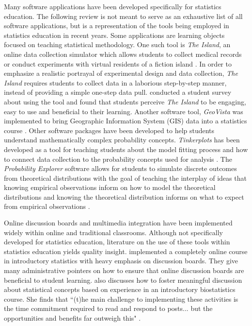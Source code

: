 \documentclass[11pt]{isuthesis}\usepackage[]{graphicx}\usepackage[]{color}
\begin{document}
Many software applications have been developed specifically for statistics education. The following review is not meant to serve as an exhaustive list of all software applications, but is a representation of the tools being employed in statistics education in recent years. Some applications are learning objects focused on teaching statistical methodology. One such tool is \textit{The Island}, an online data collection simulator which allows students to collect medical records or conduct experiments with virtual residents of a fiction island \citep{Bulmer2011}. In order to emphasize a realistic portrayal of experimental design and data collection, \textit{The Island} requires students to collect data in a laborious step-by-step manner, instead of providing a simple one-step data pull. \citet{BaglinBedfordBulmer2013} conducted a student survey about using the tool and found that students perceive \textit{The Island} to be engaging, easy to use and beneficial to their learning. Another software tool, \textit{GeoVista} was implemented to bring Geographic Information System (GIS) data into a statistics course \citep{Forbes2012}. Other software packages have been developed to help students understand mathematically complex probability concepts. \textit{Tinkerplots} has been developed as a tool for teaching students about the model fitting process and how to connect data collection to the probability concepts used for analysis \citep{Konold2008}. The \textit{Probability Explorer} software allows for students to simulate discrete outcomes from theoretical distributions with the goal of teaching the interplay of ideas that knowing empirical observations inform on how to model the theoretical distributions and knowing the theoretical distribution informs on what to expect from empirical observations \citep{Lee2009}.

Online discussion boards and multimedia integration have been implemented widely within online and traditional classrooms. Although not specifically developed for statistics education, literature on the use of these tools within statistics education yields quality insight. \citet{Everson2008} implemented a completely online course in introductory statistics with heavy emphasis on discussion boards. They give many administrative pointers on how to ensure that online discussion boards are beneficial to student learning. \citet{Schmidt2013} also discusses how to foster meaningful discussion about statistical concepts based on experience in an introductory biostatistics course.  She finds that ``(t)he main challenge to implementing these activities is the time commitment required to read and respond to posts... but the opportunities and benefits far outweigh this"  \citep[p.9]{Schmidt2013}. 
\end{document}
